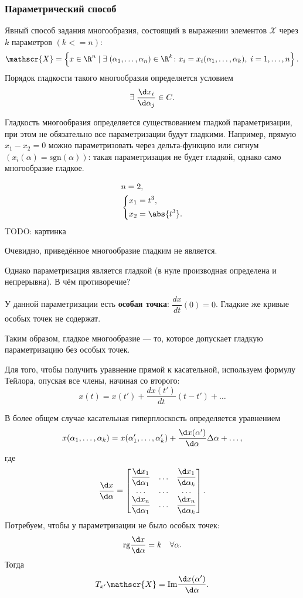 \subsubsection*{Параметрический способ}
Явный способ задания многообразия, состоящий в выражении элементов $\mathscr{X}$ через $k$ параметров $(k <= n)$:
$$
\mathscr{X} = \left\{ x \in \R^n \mid \exists\;(\alpha_1, \ldots, \alpha_n) \in \R^k \colon x_i = x_i(\alpha_1, \ldots, \alpha_k), \;  i = 1, 
\ldots, n \right\}.
$$
Порядок гладкости такого многообразия определяется условием 
$$
\exists\; \dfrac{\d x_i}{\d \alpha_j} \in C.
$$

\begin{remark}
    Гладкость многообразия определяется существованием гладкой параметризации, при этом не обязательно все параметризации будут гладкими. Например, прямую $x_1 - x_2 = 0$ можно параметризовать через дельта-функцию или сигнум $(x_i(\alpha) = \mathrm{sgn} (\alpha))$: такая параметризация не будет гладкой, однако само многообразие гладкое.
\end{remark}

\begin{example}
$$
    \begin{aligned}
        & n = 2, \\
        & \left\{
            \begin{aligned}
                &x_1 = t^3,\\
                &x_2 = \abs{t^3}.
            \end{aligned}    
        \right.
    \end{aligned}
$$
TODO: картинка
\end{example}
Очевидно, приведённое многообразие гладким не является.

Однако параметризация является гладкой (в нуле производная определена и непрерывна). В чём противоречие?

У данной параметризации есть \textbf{особая точка}: $\dfrac{d x}{d t} (0) = 0$. Гладкие же кривые особых точек не содержат.

Таким образом, гладкое многообразие --- то, которое допускает гладкую параметризацию без особых точек.

Для того, чтобы получить уравнение прямой к касательной, используем формулу Тейлора, опуская все члены, начиная со второго:
$$
x(t) = x(t') + \dfrac{d x(t')}{d t} (t - t') + \ldots
$$

В более общем случае касательная гиперплоскость определяется уравнением
$$
x(\alpha_1, \ldots, \alpha_k) = x(\alpha_1', \ldots, \alpha_k') + \dfrac{\d x (\alpha')}{\d \alpha} \Delta \alpha + \ldots,
$$
где
$$
\dfrac{\d x}{\d \alpha} =
\begin{bmatrix}
    \dfrac{\d x_1}{\d \alpha_1} & \ldots & \dfrac{\d x_1}{\d \alpha_k} \\
    \ldots & \ldots & \ldots \\
    \dfrac{\d x_n}{\d \alpha_1} & \ldots & \dfrac{\d x_n}{\d \alpha_k}
\end{bmatrix}
.
$$
Потребуем, чтобы у параметризации не было особых точек:
$$
\mathrm{rg} \dfrac{\d x}{\d \alpha} = k \quad \forall \alpha.
$$
Тогда
$$
T_{x'} \mathscr{X} = \mathrm{Im} \dfrac{\d x(\alpha')}{\d \alpha}.
$$

